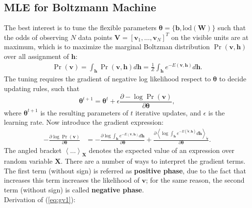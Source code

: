 \documentclass[11pt]{article}
\newcommand{\mean}[2]{\left\langle{#1}\right\rangle_{#2}}
\newcommand{\vb}{\boldsymbol{b}}
\newcommand{\vh}{\boldsymbol{h}}
\newcommand{\vv}{\boldsymbol{v}}
\newcommand{\mv}{\boldsymbol{V}}
\newcommand{\mw}{\boldsymbol{W}}
\newcommand{\mx}{\boldsymbol{X}}
\newcommand{\vvt}{\tilde{\vv}}
\newcommand{\pEC}{\boldsymbol{\theta}}
\newcommand{\PDV}[2]{\frac{\partial #1}{\partial #2}}
\begin{document}
\subsection{MLE for Boltzmann Machine}
The best interest is to tune the flexible parameters $\pEC=\{\vb, \textrm{lod}(\mw)\}$ such that the odds of observing $N$ data points $\mv=[\vv_1, \dots, \vv_N]^T$ on the visible units are at maximum, which is to maximize the marginal Boltzman distribution $\Pr(\vv, \vh)$ over all assignment of $\vh$:
\begin{equation} \label{eq:p(v)}  %
  \begin{split}
    \Pr(\vv) = \int_{\vh}{\Pr(\vv, \vh)d\vh} = \frac{1}{Z} \int_{\vh}{e^{-E(\vv, \vh)}d\vh}.
  \end{split}
\end{equation}
The tuning requires the gradient of negative log likelihood respect to $\pEC$ to decide updating rules, such that
\[ \pEC^{t+1} = \pEC^t + \epsilon \PDV{-\log{\Pr(\vv)}}{\pEC}, \]
where $\pEC^{t+1}$ is the resulting parameters of $t$ iterative updates, and $\epsilon$ is the learning rate. Now introduce the gradient expression:
\begin{align}\label{eq:gv1}
  -\PDV{\log{\Pr(\vv)}}{\pEC} &= -\PDV{\log{\int_{\vh}{e^{-E(\vv, \vh)}d\vh}}}{\pEC} + \PDV{\mean{\log{\int_{\vh}{e^{-E(\vvt, \vh)}d\vh}}}{\vvt}}{\pEC}.
\end{align}
The angled bracket $\mean{\dots}{\mx}$ denotes the expected value of an expression over random variable $\mx$.
There are a number of ways to interpret the gradient terms. The first term (without sign) is referred as \textbf{positive phase}, due to the fact that increases this term increases the likelihood of $\vv$; for the same reason, the second term (without sign) is called \textbf{negative phase}.\\
Derivation of (\ref{eq:gv1}):
\end{document}
